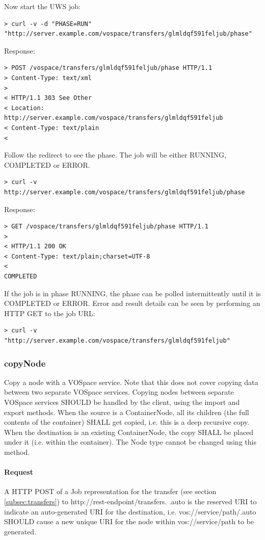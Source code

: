 \documentclass[11pt,a4paper]{ivoa}
\begin{document}
Now start the UWS job:
\begin{lstlisting}
> curl -v -d "PHASE=RUN" "http://server.example.com/vospace/transfers/glmldqf591feljub/phase"
\end{lstlisting}
Response:
\begin{lstlisting}
> POST /vospace/transfers/glmldqf591feljub/phase HTTP/1.1
> Content-Type: text/xml
>
< HTTP/1.1 303 See Other
< Location: http://server.example.com/vospace/transfers/glmldqf591feljub
< Content-Type: text/plain
<
\end{lstlisting}
Follow the redirect to see the phase.  The job will be either RUNNING, COMPLETED or ERROR.
\begin{lstlisting}
> curl -v http://server.example.com/vospace/transfers/glmldqf591feljub/phase
\end{lstlisting}
Response:
\begin{lstlisting}
> GET /vospace/transfers/glmldqf591feljub/phase HTTP/1.1
>
< HTTP/1.1 200 OK
< Content-Type: text/plain;charset=UTF-8
<
COMPLETED
\end{lstlisting}
If the job is in phase RUNNING, the phase can be polled intermittently until it is COMPLETED or ERROR.
Error and result details can be seen by performing an HTTP GET to the job URL:
\begin{lstlisting}
> curl -v "http://server.example.com/vospace/transfers/glmldqf591feljub"
\end{lstlisting}

\subsubsection{copyNode}
\label{subsubsec:copynode}
Copy a node with a VOSpace service.
Note that this does not cover copying data between two separate VOSpace services.
Copying nodes between separate VOSpace services SHOULD be handled by the client, using the import and export methods.
When the source is a ContainerNode, all its children (the full contents of the container) SHALL get copied, i.e. this is a deep recursive copy.
When the destination is an existing ContainerNode, the copy SHALL be placed under it (i.e. within the container).
The Node type cannot be changed using this method.

\paragraph{Request}
A HTTP POST of a Job representation for the transfer (see section \ref{subsec:transfers}) to http://rest-endpoint/transfers.
.auto is the reserved URI to indicate an auto-generated URI for the destination, i.e. vos://service/path/.auto SHOULD cause a new unique URI for the node within vos://service/path to be generated.
\end{document}

